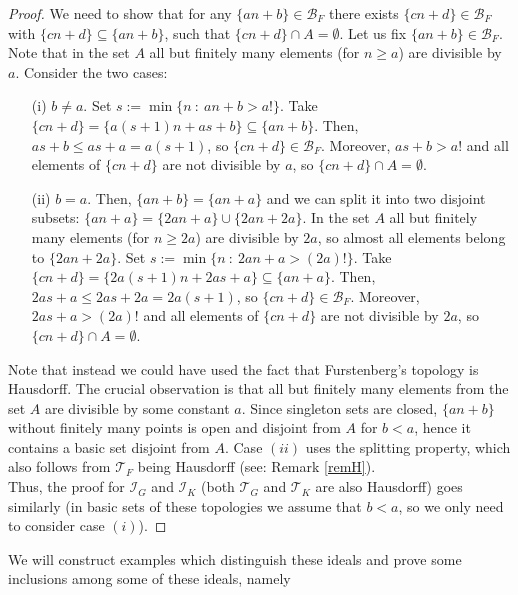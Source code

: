 \documentclass{amsart}
\theoremstyle{definition}
\theoremstyle{definition}
\newcommand{\I}{\mathcal I}
\newcommand{\T}{\mathcal{T}}
\begin{document}
\begin{proof}
We need to show that for any $\{an+b\} \in \mathcal{B}_F$ there exists $\{cn+d\} \in \mathcal{B}_F$ with $\{cn+d\} \subseteq \{an+b\}$, such that $\{cn+d\}\cap A = \emptyset$. Let us fix $\{an+b\} \in \mathcal{B}_F$. Note that in the set $A$ all but finitely many elements (for $n\geq a$) are divisible by $a$. Consider the two cases:
\begin{itemize}
 \item[(i)] $b\neq a$. Set $s:= \min \{n\ :\ an+b>a!\}$. Take $\{cn+d\} = \{a(s+1)n+as+b\} \subseteq \{an+b\}$. Then, $as+b\leq as+a = a(s+1)$, so $\{cn+d\}\in \mathcal{B}_F$. Moreover, $as+b>a!$ and all elements of $\{cn+d\}$ are not divisible by $a$, so $\{cn+d\}\cap A = \emptyset$.
 \item[(ii)] $b=a$. Then, $\{an+b\} = \{an+a\}$ and we can split it into two disjoint subsets: $\{an+a\} = \{2an+a\}\cup \{2an+2a\}$. In the set $A$ all but finitely many elements (for $n\geq 2a$) are divisible by $2a$, so almost all elements belong to $\{2an+2a\}$. Set $s:= \min \{n\ :\ 2an+a>(2a)!\}$. Take $\{cn+d\} = \{2a(s+1)n+2as+a\} \subseteq \{an+a\}$. Then, $2as+a\leq 2as+2a = 2a(s+1)$, so $\{cn+d\}\in \mathcal{B}_F$. Moreover, $2as+a>(2a)!$ and all elements of $\{cn+d\}$ are not divisible by $2a$, so $\{cn+d\}\cap A = \emptyset$.
\end{itemize}
Note that instead we could have used the fact that Furstenberg's topology is Hausdorff. The crucial observation is that all but finitely many elements from the set $A$ are divisible by some constant $a$. Since singleton sets are closed, $\{an+b\}$ without finitely many points is open and disjoint from $A$ for $b<a$, hence it contains a basic set disjoint from $A$. Case $(ii)$ uses the splitting property, which also follows from $\T_F$ being Hausdorff (see: Remark \ref{remH}).\\
Thus, the proof for $\I_G$ and $\I_K$ (both $\T_G$ and $\T_K$ are also Hausdorff) goes similarly (in basic sets of these topologies we assume that $b<a$, so we only need to consider case $(i)$).
\end{proof}

We will construct examples which 
distinguish these ideals and prove some
inclusions among some of these ideals, namely
\end{document}

